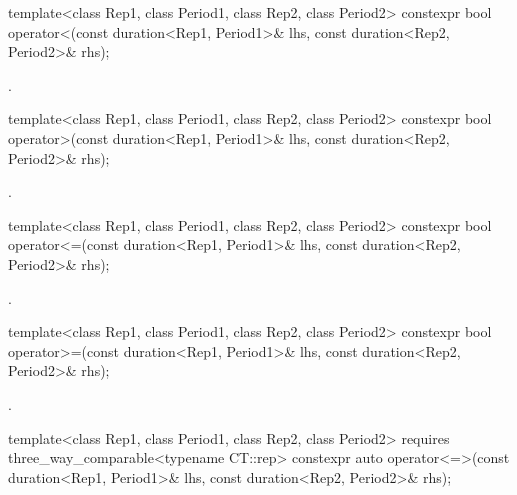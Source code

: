 %
\begin{itemdecl}
template<class Rep1, class Period1, class Rep2, class Period2>
  constexpr bool operator<(const duration<Rep1, Period1>& lhs,
                           const duration<Rep2, Period2>& rhs);
\end{itemdecl}

\begin{itemdescr}
\pnum
\returns
{}.
\end{itemdescr}

%
\begin{itemdecl}
template<class Rep1, class Period1, class Rep2, class Period2>
  constexpr bool operator>(const duration<Rep1, Period1>& lhs,
                           const duration<Rep2, Period2>& rhs);
\end{itemdecl}

\begin{itemdescr}
\pnum
\returns
{}.
\end{itemdescr}

%
\begin{itemdecl}
template<class Rep1, class Period1, class Rep2, class Period2>
  constexpr bool operator<=(const duration<Rep1, Period1>& lhs,
                            const duration<Rep2, Period2>& rhs);
\end{itemdecl}

\begin{itemdescr}
\pnum
\returns
{}.
\end{itemdescr}

%
\begin{itemdecl}
template<class Rep1, class Period1, class Rep2, class Period2>
  constexpr bool operator>=(const duration<Rep1, Period1>& lhs,
                            const duration<Rep2, Period2>& rhs);
\end{itemdecl}

\begin{itemdescr}
\pnum
\returns
{}.
\end{itemdescr}

%
\begin{itemdecl}
template<class Rep1, class Period1, class Rep2, class Period2>
    requires three_way_comparable<typename CT::rep>
  constexpr auto operator<=>(const duration<Rep1, Period1>& lhs,
                             const duration<Rep2, Period2>& rhs);
\end{itemdecl}

